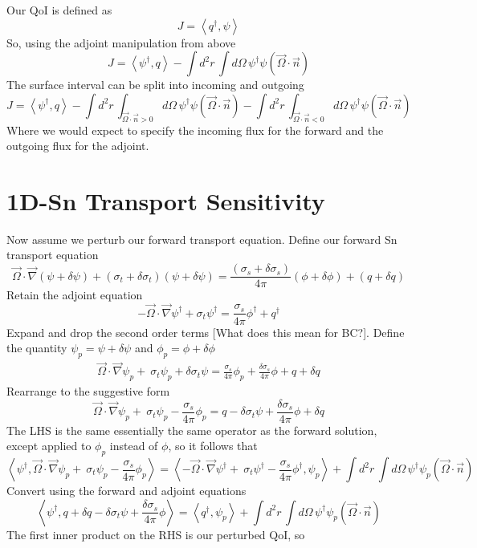 \documentclass{article}
\newcommand{\vO}{\vec{\Omega}}
\newcommand{\bra}{\left\langle}
\newcommand{\ket}{\right\rangle}
\newcommand{\vgrad}{\vec{\nabla}}
\begin{document}
Our QoI is defined as 
\[
J=\bra q^\dag , \psi \ket
\]
So, using the adjoint manipulation from above
\[
J = \bra \psi^\dag , q \ket - \int d^2 r \, \int d  \Omega \, \psi^\dag \psi ( \vO \cdot \vec{n} )
\]
The surface interval can be split into incoming and outgoing 
\[
J = \bra \psi^\dag , q \ket - \int d^2 r \, \int_{\vO \cdot \vec{n} >0} d  \Omega \, \psi^\dag \psi ( \vO \cdot \vec{n} ) - \int d^2 r \, \int_{\vO \cdot \vec{n} <0} d  \Omega \, \psi^\dag \psi ( \vO \cdot \vec{n} )
\]
Where we would expect to specify the incoming flux for the forward and the outgoing flux for the adjoint.
\section{1D-Sn Transport Sensitivity}
Now assume we perturb our forward transport equation.
Define our forward Sn transport equation
\[
\vO \cdot \vgrad \left( \psi + \delta \psi \right) + \left( \sigma_t + \delta \sigma_t \right) \left( \psi + \delta \psi \right) = \frac{\left( \sigma_s + \delta \sigma_s \right)}{4 \pi} \left( \phi + \delta \phi \right) + \left( q + \delta q \right)
\]
Retain the adjoint equation
\[
- \vO \cdot \vgrad \psi^\dag + \sigma_t \psi^\dag = \frac{\sigma_s}{4 \pi} \phi^\dag + q^\dag
\]
Expand and drop the second order terms [What does this mean for BC?]. Define the quantity $\psi_p = \psi + \delta \psi$ and $\phi_p = \phi + \delta \phi$
\begin{align*}
\vO \cdot \vgrad  \psi_p + \ \sigma_t \psi_p + \delta \sigma_t \psi = \frac{ \sigma_s }{4 \pi}  \phi_p + \frac{ \delta \sigma_s }{4 \pi}  \phi  + q + \delta q 
\end{align*}
Rearrange to the suggestive form
\[
\vO \cdot \vgrad  \psi_p + \ \sigma_t \psi_p - \frac{ \sigma_s }{4 \pi}  \phi_p  = q - \delta \sigma_t \psi + \frac{ \delta \sigma_s }{4 \pi}  \phi  + \delta q 
\]
The LHS is the same essentially the same operator as the forward solution, except applied to $\phi_p$ instead of $\phi$, so it follows that 
\[
\bra \psi^\dag , \vO \cdot \vgrad  \psi_p + \ \sigma_t \psi_p - \frac{ \sigma_s }{4 \pi}  \phi_p  \ket = \bra - \vO \cdot \vgrad  \psi^\dag + \ \sigma_t \psi^\dag - \frac{ \sigma_s }{4 \pi}  \phi^\dag , \psi_p \ket +  \int d^2 r \, \int d  \Omega \, \psi^\dag \psi_p ( \vO \cdot \vec{n})
\]
Convert using the forward and adjoint equations
\[
\bra \psi^\dag ,  q + \delta q - \delta \sigma_t \psi + \frac{ \delta \sigma_s }{4 \pi}  \phi   \ket = \bra q^\dag , \psi_p \ket +  \int d^2 r \, \int d  \Omega \, \psi^\dag \psi_p ( \vO \cdot \vec{n})
\]
The first inner product on the RHS is our perturbed QoI, so
\end{document}
